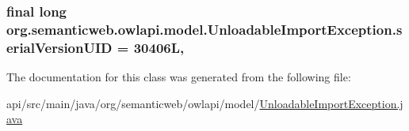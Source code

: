 \hypertarget{classorg_1_1semanticweb_1_1owlapi_1_1model_1_1_unloadable_import_exception_a1e7a0bb374332656edfe940b14299c96}{
\subsubsection[{serial\-Version\-U\-I\-D}]{\setlength{\rightskip}{0pt plus 5cm}final long org.\-semanticweb.\-owlapi.\-model.\-Unloadable\-Import\-Exception.\-serial\-Version\-U\-I\-D = 30406\-L\hspace{0.3cm}{\ttfamily [static]}, {\ttfamily [private]}}}\label{classorg_1_1semanticweb_1_1owlapi_1_1model_1_1_unloadable_import_exception_a1e7a0bb374332656edfe940b14299c96}


The documentation for this class was generated from the following file\-:\begin{DoxyCompactItemize}
\item 
api/src/main/java/org/semanticweb/owlapi/model/\hyperlink{_unloadable_import_exception_8java}{Unloadable\-Import\-Exception.\-java}\end{DoxyCompactItemize}
